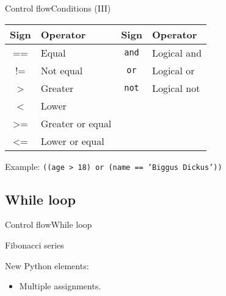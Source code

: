 \documentclass[10pt,compress]{beamer} %
\begin{document}
\begin{frame}[fragile]{Control flow}{Conditions (III)}
	\centering \begin{tabular}{cl|cl}\hline
	\sc Sign & \sc Operator & \sc Sign 	& \sc Operator \\ \hline
	== 	 & Equal   		& \texttt{and} 	& Logical and \\
	!= 	& Not equal  	& \texttt{or}	& Logical or  \\
	> 	& Greater 		& \texttt{not}	& Logical not \\
	< 	& Lower			&   	& \\
	>= 	& Greater or equal 		& 	& \\
	<= 	& Lower or equal 		& 	& \\\hline
	\end{tabular}

	\bigskip

	Example: \texttt{((age > 18) or (name == 'Biggus Dickus'))}
\end{frame}

\subsection{While loop}
\begin{frame}{Control flow}{While loop}
	\begin{block}{Fibonacci series}
	\vspace{-0.2cm}
		
	\end{block}

    New Python elements:
	\begin{itemize}
	\item Multiple assignments.
	\end{itemize}
	
\end{frame}
\end{document}
